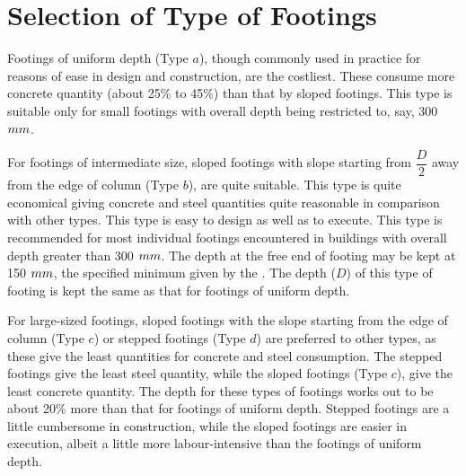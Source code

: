 \section{Selection of Type of Footings}
Footings of uniform depth (Type $a$), though commonly used in practice
for reasons of ease in design and construction, are the costliest. These
consume more concrete quantity (about 25\% to 45\%) than that by sloped
footings. This type is suitable only for small footings with overall
depth being restricted to, say, 300 $mm$.

For footings of intermediate size, sloped footings with slope starting
from $\dfrac{D}{2}$ away from the edge of column (Type $b$), are quite 
suitable. This type is quite economical giving concrete and steel 
quantities quite reasonable in comparison with other types. This type 
is easy to design as well as to execute. This type is recommended for
most individual footings encountered in buildings with overall depth
greater than 300 $mm$. The depth at the free end of footing may be kept 
at 150 $mm$, the specified minimum given by the . The depth ($D$) of
this type of footing is kept the same as that for footings of uniform
depth.

For large-sized footings, sloped footings with the slope starting from 
the edge of column (Type $c$) or stepped footings (Type $d$) are
preferred to other types, as these give the least quantities for
concrete and steel consumption. The stepped footings give the least
steel quantity, while the sloped footings (Type $c$), give the least
concrete quantity. The depth for these types of footings works out to
be about 20\% more than that for footings of uniform depth. Stepped
footings are a little cumbersome in construction, while the sloped 
footings are easier in execution, albeit a little more labour-intensive 
than the footings of uniform depth.


